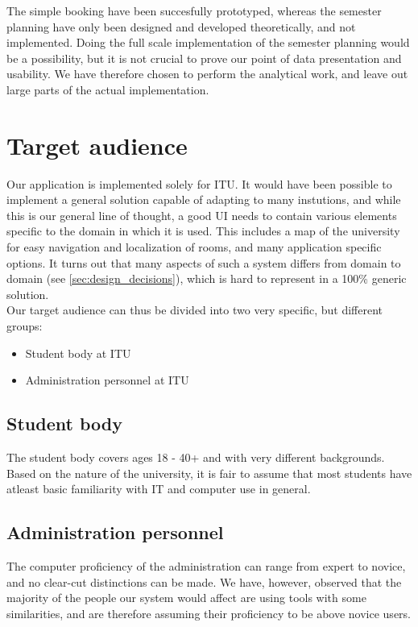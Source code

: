 The simple booking have been succesfully prototyped, whereas the semester planning have only been designed and developed theoretically, and not implemented. Doing the full scale implementation of the semester planning would be a possibility, but it is not crucial to prove our point of data presentation and usability. We have therefore chosen to perform the analytical work, and leave out large parts of the actual implementation.

\section{Target audience} %
\label{sec:target_audience}
Our application is implemented solely for ITU. It would have been possible to implement a general solution capable of adapting to many instutions, and while this is our general line of thought, a good UI needs to contain various elements specific to the domain in which it is used. This includes a map of the university for easy navigation and localization of rooms, and many application specific options. It turns out that many aspects of such a system differs from domain to domain (see \ref{sec:design_decisions}), which is hard to represent in a 100\% generic solution.\\

Our target audience can thus be divided into two very specific, but different groups:
\begin{itemize}
\item Student body at ITU
\item Administration personnel at ITU
\end{itemize}

\subsection*{Student body}
The student body covers ages 18 - 40+ and with very different backgrounds. Based on the nature of the university, it is fair to assume that most students have atleast basic familiarity with IT and computer use in general.

\subsection*{Administration personnel}
The computer proficiency of the administration can range from expert to novice, and no clear-cut distinctions can be made. We have, however, observed that the majority of the people our system would affect are using tools with some similarities, and are therefore assuming their proficiency to be above novice users.

